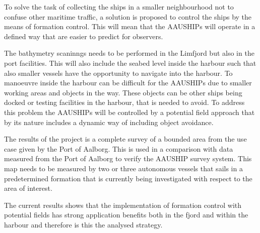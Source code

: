 \documentclass[a4paper,12pt]{article}
\begin{document}
To solve the task of collecting the ships in a smaller neighbourhood
not to confuse other maritime traffic, a solution is proposed to
control the ships by the means of formation control. This will mean
that the AAUSHIPs will operate in a defined way that are easier to predict
for observers.

The bathymetry scaninngs needs to be performed in the Limfjord but
also in the port facilities. This will also include the seabed
level inside the harbour such that also smaller vessels have the
opportunity to navigate into the harbour. To manoeuvre inside the
harbour can be difficult for the AAUSHIPs due to smaller working areas
and objects in the way. These objects can be other ships being docked
or testing facilities in the harbour, that is needed to avoid. To
address this problem the AAUSHIPs will be controlled by a potential
field approach that by its nature includes a dynamic way of including
object avoidance.

The results of the project is a complete survey of a
bounded area from the use case given by the Port of Aalborg. This is
used in a comparison with data measured from the Port of Aalborg to
verify the AAUSHIP survey system. This map
needs to be measured by two or three autonomous vessels that sails in
a predetermined formation that is currently being investigated with
respect to the area of interest.

The current results shows that the implementation of formation control
with potential fields has strong application benefits both in the
fjord and within the harbour and therefore is this the analysed
strategy.



 
\end{document}
